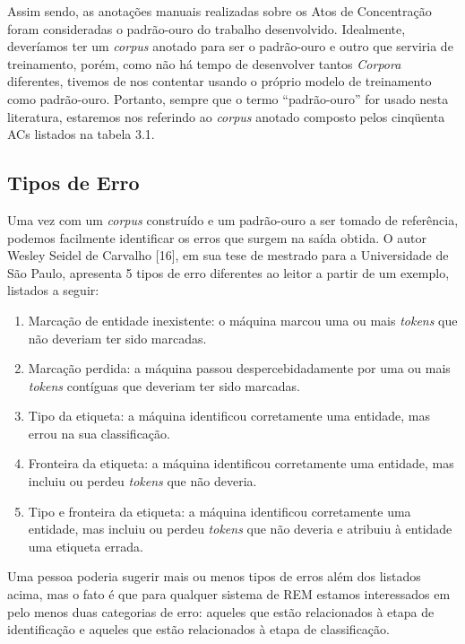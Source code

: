\documentclass[11pt]{report}
\newcommand{\quotes}[1]{``#1''}
\begin{document}
Assim sendo, as anotações manuais realizadas sobre os Atos de Concentração foram consideradas o padrão-ouro do trabalho desenvolvido. Idealmente,
deveríamos ter um \textit{corpus} anotado para ser o padrão-ouro e outro que serviria de treinamento, porém, como não há tempo de desenvolver tantos \textit{Corpora} diferentes, tivemos de nos
contentar usando o próprio modelo de treinamento como padrão-ouro. Portanto, sempre que o termo \quotes{padrão-ouro} for usado nesta literatura, estaremos nos referindo ao \textit{corpus}
anotado composto pelos cinqüenta ACs listados na tabela 3.1.

\subsection{Tipos de Erro}

\indent\indent Uma vez com um \textit{corpus} construído e um padrão-ouro a ser tomado de referência, podemos facilmente identificar os erros que surgem na saída obtida. O autor
Wesley Seidel de Carvalho [16], em sua tese de mestrado para a Universidade de São Paulo, apresenta 5 tipos de erro diferentes ao leitor a partir de um exemplo, listados a seguir:

\begin{enumerate}[label=\textbf{E\arabic*.}]
  \item Marcação de entidade inexistente: o máquina marcou uma ou mais \textit{tokens} que não deveriam ter sido marcadas.
  \item Marcação perdida: a máquina passou despercebidadamente por uma ou mais \textit{tokens} contíguas que deveriam ter sido marcadas.
  \item Tipo da etiqueta: a máquina identificou corretamente uma entidade, mas errou na sua classificação.
  \item Fronteira da etiqueta: a máquina identificou corretamente uma entidade, mas incluiu ou perdeu \textit{tokens} que não deveria.
  \item Tipo e fronteira da etiqueta: a máquina identificou corretamente uma entidade, mas incluiu ou perdeu \textit{tokens} que não deveria e atribuiu à entidade uma etiqueta errada.
\end{enumerate}

Uma pessoa poderia sugerir mais ou menos tipos de erros além
dos listados acima, mas o fato é que para qualquer sistema de REM estamos interessados em pelo menos duas categorias de erro: aqueles que estão relacionados à etapa de identificação
e aqueles que estão relacionados à etapa de classificação.
\end{document}
